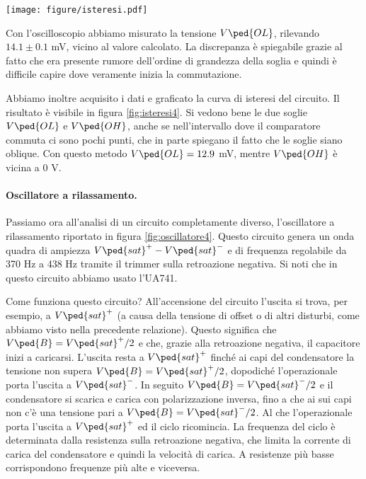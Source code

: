 \begin{SCfigure*}[1][t]
    \texttt{[image: figure/isteresi.pdf]}
    \caption{Curva di isteresi del trigger di Schmitt. La curva di isteresi si ottiene graficando la tensione in output versus la tensione
        di input. In questo caso l'input va da - 0.3 V a 0.3 V e ritorno. Si vedono bene le due soglie e la banda di
        isteresi. L'ampiezza dell'output è 13.7 V.}
	\label{fig:isteresi4}
\end{SCfigure*}

Con l'oscilloscopio abbiamo misurato la tensione $V\ped{OL}$, rilevando $14.1 \pm 0.1$ mV, vicino al valore calcolato.
La discrepanza è spiegabile grazie al fatto che era presente rumore dell'ordine di grandezza della soglia e quindi
è difficile capire dove veramente inizia la commutazione.

Abbiamo inoltre acquisito i dati e graficato la curva di isteresi del circuito. Il risultato è visibile in figura \ref{fig:isteresi4}.
Si vedono bene le due soglie $V\ped{OL}$ e $V\ped{OH}$, anche se nell'intervallo dove il comparatore commuta ci sono pochi
punti, che in parte spiegano il fatto che le soglie siano oblique. Con questo metodo $V\ped{OL} = 12.9$ mV, mentre $V\ped{OH}$ è
vicina a 0 V.

\paragraph{Oscillatore a rilassamento.}

Passiamo ora all'analisi di un circuito completamente diverso, l'oscillatore a rilassamento riportato in
figura \ref{fig:oscillatore4}. Questo circuito genera un onda quadra di ampiezza $V\ped{sat}^+ - V\ped{sat}^-$
e di frequenza regolabile da 370 Hz a 438 Hz tramite il trimmer sulla retroazione negativa. Si noti che in questo
circuito abbiamo usato l'UA741.

Come funziona questo circuito? All'accensione del circuito l'uscita si trova, per esempio, a $V\ped{sat}^+$ (a causa
della tensione di offset o di altri disturbi, come abbiamo visto nella precedente relazione). Questo significa che
$V\ped{B} = V\ped{sat}^+/2$ e che, grazie alla retroazione negativa, il capacitore inizi a caricarsi.
L'uscita resta a $V\ped{sat}^+$ finché ai capi del condensatore la tensione non supera $V\ped{B} = V\ped{sat}^+/2$, dopodiché
l'operazionale porta l'uscita a $V\ped{sat}^-$. In seguito $V\ped{B} = V\ped{sat}^-/2$ e il condensatore si scarica
e carica con polarizzazione inversa, fino a che ai sui capi non c'è una tensione pari a $V\ped{B} = V\ped{sat}^-/2$. Al che
l'operazionale porta l'uscita a $V\ped{sat}^+$ ed il ciclo ricomincia. La frequenza del ciclo è determinata dalla resistenza
sulla retroazione negativa, che limita la corrente di carica del condensatore e quindi la velocità di carica.
A resistenze più basse corrispondono frequenze più alte e viceversa.

